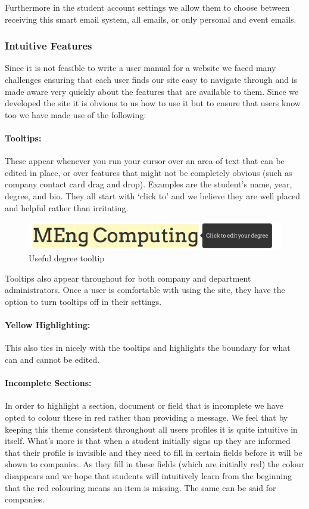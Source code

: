     Furthermore in the student account settings we allow them to choose between receiving this smart email system, all emails, or only personal and event emails.

  \subsubsection{Intuitive Features}
    Since it is not feasible to write a user manual for a website we faced many challenges ensuring that each user finds our site easy to navigate through and is made aware very quickly about the features that are available to them. Since we developed the site it is obvious to us how to use it but to ensure that users know too we have made use of the following:

    \paragraph{Tooltips:} These appear whenever you run your cursor over an area of text that can be edited in place, or over features that might not be completely obvious (such as company contact card drag and drop). Examples are the student's name, year, degree, and bio. They all start with `click to' and we believe they are well placed and helpful rather than irritating.      
    \begin{figure}[H]\centering
    \includegraphics[scale=0.5]{images/design/edit_degree_tooltip}
    \caption{Useful degree tooltip}
    \end{figure}
    Tooltips also appear throughout for both company and department administrators.
    Once a user is comfortable with using the site, they have the option to turn tooltips off in their settings.

    \paragraph{Yellow Highlighting:} This also ties in nicely with the tooltips and highlights the boundary for what can and cannot be edited.

    \paragraph{Incomplete Sections:} In order to highlight a section, document or field that is incomplete we have opted to colour these in red rather than providing a message. We feel that by keeping this theme consistent throughout all users profiles it is quite intuitive in itself.
    What's more is that when a student initially signs up they are informed that their profile is invisible and they need to fill in certain fields before it will be shown to companies. As they fill in these fields (which are initially red) the colour disappears and we hope that students will intuitively learn from the beginning that the red colouring means an item is missing. The same can be said for companies.

